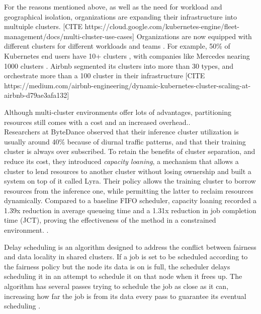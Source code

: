 For the reasons mentioned above, as well as the need for workload and
geographical isolation, organizations are expanding their infrastructure into
multuiple clusters. [CITE
https://cloud.google.com/kubernetes-engine/fleet-management/docs/multi-cluster-use-cases]
\cite{google-cloud-blog} Organizations are now equipped with different clusters
for different workloads and teams \cite{patel_what_2022, li_lyra_2023}. For
example, 50\% of Kubernetes \cite{borg} end users have 10+ clusters
\cite{noauthor_cncf_2023} , with companies like Mercedes nearing 1000 clusters
\cite{noauthor_mercedes-benz_2023}. Airbnb segmented its clusters into more
than 30 types, and orchestrate more than a 100 cluster in their infrastructure
[CITE
https://medium.com/airbnb-engineering/dynamic-kubernetes-cluster-scaling-at-airbnb-d79ae3afa132] 

Although multi-cluster environments offer lots of advantages, partitioning
resources still comes with a cost and an increased overhead.\cite{adv-dis-mutli}.\\

Researchers at ByteDance observed that their inference cluster utilization is
usually around 40\% because of diurnal traffic patterns, and that their
training cluster is always over subscribed. To retain the benefits of cluster
separation, and reduce its cost, they introduced \textit{capacity loaning}, a
mechanism that allows a cluster to lend resources to another cluster without
losing ownership and built a system on top of it called Lyra. Their policy
allows the training cluster to borrow resources from the inference one, while
permitting the latter to reclaim resources dynamically. Compared to a baseline
FIFO scheduler, capacity loaning recorded a 1.39x reduction in average queueing
time and a 1.31x reduction in job completion time (JCT), proving the
effectiveness of the method in a constrained environment. \cite{li_lyra_2023}.

Delay scheduling is an algorithm designed to address the conflict between
fairness and data locality in shared clusters. If a job is set to be scheduled
according to the fairness policy but the node its data is on is full, the
scheduler delays scheduling it in an attempt to schedule it on that node when
it frees up. The algorithm has several passes trying to schedule the job as
close as it can, increasing how far the job is from its data every pass to
guarantee its eventual scheduling \cite{zaharia_delay_2010}.

